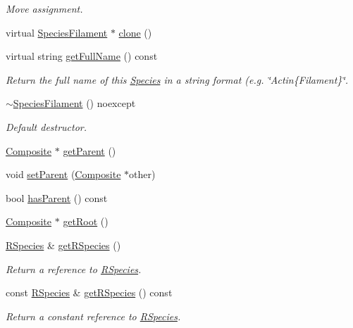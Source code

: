 \begin{DoxyCompactItemize}
\begin{DoxyCompactList}\small\item\em Move assignment. \end{DoxyCompactList}\item 
virtual \hyperlink{classSpeciesFilament}{Species\+Filament} $\ast$ \hyperlink{classSpeciesFilament_a1a4b86c27795ca658c65ac415f8861a7}{clone} ()
\item 
virtual string \hyperlink{classSpeciesFilament_a18ee4cfa2eb8ba642b97996924564292}{get\+Full\+Name} () const 
\begin{DoxyCompactList}\small\item\em Return the full name of this \hyperlink{classSpecies}{Species} in a string format (e.\+g. \char`\"{}\+Actin\{\+Filament\}\char`\"{}. \end{DoxyCompactList}\item 
\hyperlink{classSpeciesFilament_a1b511784f8db85fe058fc3aadad1ace8}{$\sim$\+Species\+Filament} () noexcept
\begin{DoxyCompactList}\small\item\em Default destructor. \end{DoxyCompactList}\item 
\hyperlink{classComposite}{Composite} $\ast$ \hyperlink{classSpecies_af24cab7cbaa561d35b08fef5faf05fdf}{get\+Parent} ()
\item 
void \hyperlink{classSpecies_acc64c5b61abf911872d433ac32b62de8}{set\+Parent} (\hyperlink{classComposite}{Composite} $\ast$other)
\item 
bool \hyperlink{classSpecies_a40262d7217fcc28a31682aee40a19232}{has\+Parent} () const 
\item 
\hyperlink{classComposite}{Composite} $\ast$ \hyperlink{classSpecies_a876c8a827476a11e05f3b7a7669c29b6}{get\+Root} ()
\item 
\hyperlink{classRSpecies}{R\+Species} \& \hyperlink{classSpecies_a048dd7bc3fecd08b1b1797dc83aa163d}{get\+R\+Species} ()
\begin{DoxyCompactList}\small\item\em Return a reference to \hyperlink{classRSpecies}{R\+Species}. \end{DoxyCompactList}\item 
const \hyperlink{classRSpecies}{R\+Species} \& \hyperlink{classSpecies_aa1069a34b360f84d186f48bd99f80971}{get\+R\+Species} () const 
\begin{DoxyCompactList}\small\item\em Return a constant reference to \hyperlink{classRSpecies}{R\+Species}. \end{DoxyCompactList}\item 

\end{DoxyCompactItemize}
